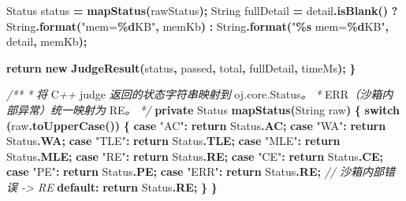 \documentclass[
  11pt,
]{ctexart}
\newenvironment{Shaded}{\begin{snugshade}}{\end{snugshade}}
\newcommand{\BuiltInTok}[1]{#1}
\newcommand{\CommentTok}[1]{\textcolor[rgb]{0.56,0.35,0.01}{\textit{#1}}}
\newcommand{\ControlFlowTok}[1]{\textcolor[rgb]{0.13,0.29,0.53}{\textbf{#1}}}
\newcommand{\FunctionTok}[1]{\textcolor[rgb]{0.13,0.29,0.53}{\textbf{#1}}}
\newcommand{\KeywordTok}[1]{\textcolor[rgb]{0.13,0.29,0.53}{\textbf{#1}}}
\newcommand{\NormalTok}[1]{#1}
\newcommand{\OperatorTok}[1]{\textcolor[rgb]{0.81,0.36,0.00}{\textbf{#1}}}
\newcommand{\SpecialCharTok}[1]{\textcolor[rgb]{0.81,0.36,0.00}{\textbf{#1}}}
\newcommand{\StringTok}[1]{\textcolor[rgb]{0.31,0.60,0.02}{#1}}
\begin{document}
\begin{Shaded}
\begin{Highlighting}[]
\NormalTok{        Status status }\OperatorTok{=} \FunctionTok{mapStatus}\OperatorTok{(}\NormalTok{rawStatus}\OperatorTok{);}
        \BuiltInTok{String}\NormalTok{ fullDetail }\OperatorTok{=}\NormalTok{ detail}\OperatorTok{.}\FunctionTok{isBlank}\OperatorTok{()}
            \OperatorTok{?} \BuiltInTok{String}\OperatorTok{.}\FunctionTok{format}\OperatorTok{(}\StringTok{"mem=}\SpecialCharTok{\%d}\StringTok{KB"}\OperatorTok{,}\NormalTok{ memKb}\OperatorTok{)}
            \OperatorTok{:} \BuiltInTok{String}\OperatorTok{.}\FunctionTok{format}\OperatorTok{(}\StringTok{"}\SpecialCharTok{\%s}\StringTok{ mem=}\SpecialCharTok{\%d}\StringTok{KB"}\OperatorTok{,}\NormalTok{ detail}\OperatorTok{,}\NormalTok{ memKb}\OperatorTok{);}

        \ControlFlowTok{return} \KeywordTok{new} \FunctionTok{JudgeResult}\OperatorTok{(}\NormalTok{status}\OperatorTok{,}\NormalTok{ passed}\OperatorTok{,}\NormalTok{ total}\OperatorTok{,}\NormalTok{ fullDetail}\OperatorTok{,}\NormalTok{ timeMs}\OperatorTok{);}
    \OperatorTok{\}}

    \CommentTok{/**}
     \CommentTok{*} \CommentTok{将}\NormalTok{ C}\CommentTok{++}\NormalTok{ judge }\CommentTok{返回的状态字符串映射到}\NormalTok{ oj}\CommentTok{.}\NormalTok{core}\CommentTok{.}\NormalTok{Status}\CommentTok{。}
     \CommentTok{*}\NormalTok{ ERR}\CommentTok{（沙箱内部异常）统一映射为}\NormalTok{ RE}\CommentTok{。}
     \CommentTok{*/}
    \KeywordTok{private}\NormalTok{ Status }\FunctionTok{mapStatus}\OperatorTok{(}\BuiltInTok{String}\NormalTok{ raw}\OperatorTok{)} \OperatorTok{\{}
        \ControlFlowTok{switch} \OperatorTok{(}\NormalTok{raw}\OperatorTok{.}\FunctionTok{toUpperCase}\OperatorTok{())} \OperatorTok{\{}
            \ControlFlowTok{case} \StringTok{"AC"}\OperatorTok{:}  \ControlFlowTok{return}\NormalTok{ Status}\OperatorTok{.}\FunctionTok{AC}\OperatorTok{;}
            \ControlFlowTok{case} \StringTok{"WA"}\OperatorTok{:}  \ControlFlowTok{return}\NormalTok{ Status}\OperatorTok{.}\FunctionTok{WA}\OperatorTok{;}
            \ControlFlowTok{case} \StringTok{"TLE"}\OperatorTok{:} \ControlFlowTok{return}\NormalTok{ Status}\OperatorTok{.}\FunctionTok{TLE}\OperatorTok{;}
            \ControlFlowTok{case} \StringTok{"MLE"}\OperatorTok{:} \ControlFlowTok{return}\NormalTok{ Status}\OperatorTok{.}\FunctionTok{MLE}\OperatorTok{;}
            \ControlFlowTok{case} \StringTok{"RE"}\OperatorTok{:}  \ControlFlowTok{return}\NormalTok{ Status}\OperatorTok{.}\FunctionTok{RE}\OperatorTok{;}
            \ControlFlowTok{case} \StringTok{"CE"}\OperatorTok{:}  \ControlFlowTok{return}\NormalTok{ Status}\OperatorTok{.}\FunctionTok{CE}\OperatorTok{;}
            \ControlFlowTok{case} \StringTok{"PE"}\OperatorTok{:}  \ControlFlowTok{return}\NormalTok{ Status}\OperatorTok{.}\FunctionTok{PE}\OperatorTok{;}
            \ControlFlowTok{case} \StringTok{"ERR"}\OperatorTok{:} \ControlFlowTok{return}\NormalTok{ Status}\OperatorTok{.}\FunctionTok{RE}\OperatorTok{;}   \CommentTok{// 沙箱内部错误 {-}\textgreater{} RE}
            \KeywordTok{default}\OperatorTok{:}    \ControlFlowTok{return}\NormalTok{ Status}\OperatorTok{.}\FunctionTok{RE}\OperatorTok{;}
        \OperatorTok{\}}
    \OperatorTok{\}}


\end{Highlighting}
\end{Shaded}
\end{document}
